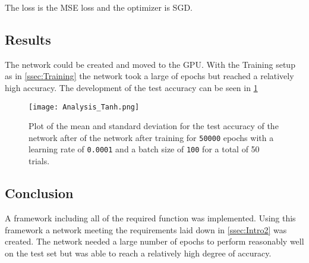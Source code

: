 \documentclass[11pt,english]{article}
\begin{document}
	The loss is the MSE loss and the optimizer is SGD.
	
	\subsection{Results}
	
	The network could be created and moved to the GPU. With the Training setup as in \cref{ssec:Training} the network took a large of epochs but reached a relatively high accuracy. The development of the test accuracy can be seen in \cref{fig:analysis_tanh}
	
	\begin{figure}
		\centering
		\texttt{[image: Analysis\_Tanh.png]}
		\caption{Plot of the mean and standard deviation for the test accuracy of the network after of the network after training for \lstinline|50000| epochs with a learning rate of \lstinline|0.0001| and a batch size of \lstinline|100| for a total of 50 trials.}
		\label{fig:analysis_tanh}
	\end{figure} 
	
	\subsection{Conclusion}
	A framework including all of the required function was implemented. Using this framework a network meeting the requirements laid down in \cref{ssec:Intro2} was created. The network needed a large number of epochs to perform reasonably well on the test set but was able to reach a relatively high degree of accuracy.
	
	
	\printbibliography
\end{document}
